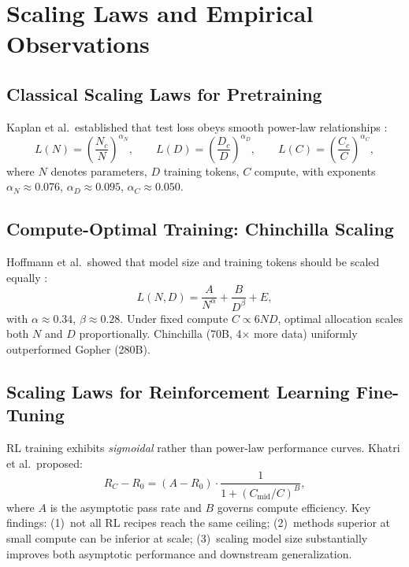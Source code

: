 \documentclass[12pt,a4paper]{report}
\begin{document}
\section{Scaling Laws and Empirical Observations}
\label{sec:scaling-laws}

\subsection{Classical Scaling Laws for Pretraining}

Kaplan et al.\ established that test loss obeys smooth power-law relationships \cite{kaplan2020scaling}:
\begin{equation}
  L(N) = \left(\frac{N_c}{N}\right)^{\!\alpha_N}\!,\qquad
  L(D) = \left(\frac{D_c}{D}\right)^{\!\alpha_D}\!,\qquad
  L(C) = \left(\frac{C_c}{C}\right)^{\!\alpha_C}\!,
  \label{eq:kaplan-power-laws}
\end{equation}
where $N$ denotes parameters, $D$ training tokens, $C$ compute, with exponents $\alpha_N \approx 0.076$, $\alpha_D \approx 0.095$, $\alpha_C \approx 0.050$.

\subsection{Compute-Optimal Training: Chinchilla Scaling}

Hoffmann et al.\ showed that model size and training tokens should be scaled equally \cite{hoffmann2022chinchilla}:
\begin{equation}
  L(N, D) = \frac{A}{N^{\alpha}} + \frac{B}{D^{\beta}} + E,
  \label{eq:chinchilla}
\end{equation}
with $\alpha \approx 0.34$, $\beta \approx 0.28$. Under fixed compute $C \propto 6ND$, optimal allocation scales both $N$ and $D$ proportionally. Chinchilla (70B, 4$\times$ more data) uniformly outperformed Gopher (280B).

\subsection{Scaling Laws for Reinforcement Learning Fine-Tuning}

RL training exhibits \emph{sigmoidal} rather than power-law performance curves. Khatri et al.\ proposed:
\begin{equation}
  R_C - R_0 = (A - R_0) \cdot \frac{1}{1 + (C_{\text{mid}} / C)^B},
  \label{eq:rl-sigmoid}
\end{equation}
where $A$ is the asymptotic pass rate and $B$ governs compute efficiency. Key findings: (1)~not all RL recipes reach the same ceiling; (2)~methods superior at small compute can be inferior at scale; (3)~scaling model size substantially improves both asymptotic performance and downstream generalization.
\end{document}
